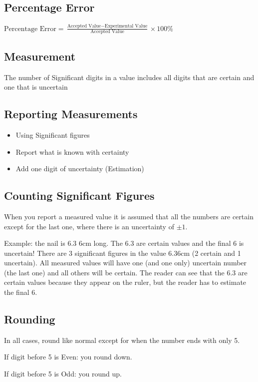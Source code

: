 \documentclass[12pt]{article}
\begin{document}
\subsection{Percentage Error}

$\text{Percentage Error}=\frac{\text{Accepted Value}-\text{Experimental Value}}{\text{Accepted Value}}\times100\%$

\subsection{Measurement}

The number of Significant digits in a value includes all digits that are certain and one that is uncertain

\subsection{Reporting Measurements}

\begin{itemize}
    \item Using Significant figures
    \item Report what is known with certainty
    \item Add one digit of uncertainty (Estimation)
\end{itemize}
\subsection{Counting Significant Figures}
When you report a measured value it is assumed that all the numbers are certain except for the last one, where there is an uncertainty of $\pm1$.

Example: the nail is 6.3 6cm long. The 6.3 are
certain values and the final 6 is uncertain! There are
3 significant figures in the value 6.36cm (2 certain
and 1 uncertain). All measured values will have one
(and one only) uncertain number (the last one) and
all others will be certain. The reader can see that the
6.3 are certain values because they appear on the
ruler, but the reader has to estimate the final 6.

\subsection{Rounding}
In all cases, round like normal except for when the number ends with only 5.

If digit before 5 is Even: you round down.

If digit before 5 is Odd: you round up.
\end{document}
